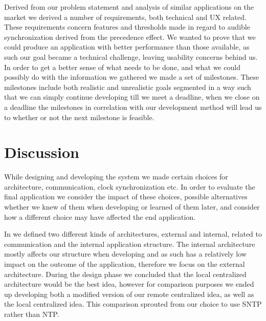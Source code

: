 Derived from our problem statement and analysis of similar applications on the market we derived a number of requirements, both technical and \ac{UX} related.
These requirements concern features and thresholds made in regard to audible synchronization derived from the precedence effect.
We wanted to prove that we could produce an application with better performance than those available, as such our goal became a technical challenge, leaving usability concerns behind us.
In order to get a better sense of what needs to be done, and what we could possibly do with the information we gathered we made a set of milestones.
These milestones include both realistic and unrealistic goals segmented in a way such that we can simply continue developing till we meet a deadline, when we close on a deadline the milestones in correlation with our development method will lead us to whether or not the next milestone is feasible.



\section{Discussion}
While designing and developing the system we made certain choices for architecture, communication, clock synchronization etc.
In order to evaluate the final application we consider the impact of these choices, possible alternatives whether we knew of them when developing or learned of them later, and consider how a different choice may have affected the end application.

In  we defined two different kinds of architectures, external and internal, related to communication and the internal application structure.
The internal architecture mostly affects our structure when developing and as such has a relatively low impact on the outcome of the application, therefore we focus on the external architecture.
During the design phase we concluded that the local centralized architecture would be the best idea, however for comparison purposes we ended up developing both a modified version of our remote centralized idea, as well as the local centralized idea.
This comparison sprouted from our choice to use \ac{SNTP} rather than \ac{NTP}.

